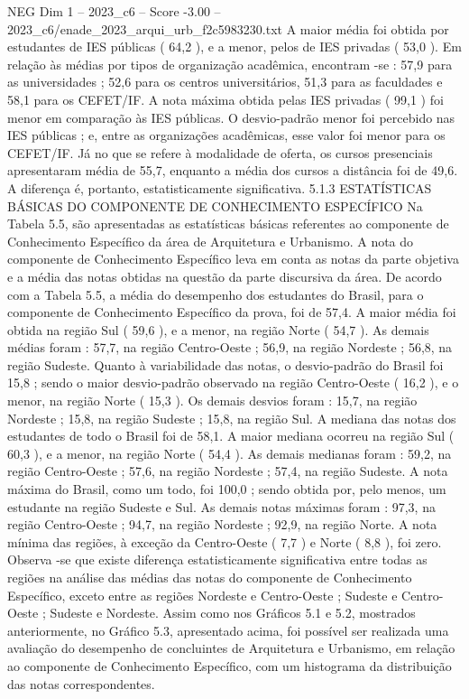 \begin{textsample}{NEG Dim 1 – 2023\_c6 – Score -3.00 – 2023\_c6/enade\_2023\_arqui\_urb\_f2c5983230.txt}
A maior média foi obtida por estudantes de IES públicas ( 64,2 ), e a menor, pelos de IES privadas ( 53,0 ).
Em relação às médias por tipos de organização acadêmica, encontram -se : 57,9 para as universidades ; 52,6 para os centros universitários, 51,3 para as faculdades e 58,1 para os CEFET/IF.
A nota máxima obtida pelas IES privadas ( 99,1 ) foi menor em comparação às IES públicas.
O desvio-padrão menor foi percebido nas IES públicas ; e, entre as organizações acadêmicas, esse valor foi menor para os CEFET/IF.
Já no que se refere à modalidade de oferta, os cursos presenciais apresentaram média de 55,7, enquanto a média dos cursos a distância foi de 49,6.
A diferença é, portanto, estatisticamente significativa. 5.1.3 ESTATÍSTICAS BÁSICAS DO COMPONENTE DE CONHECIMENTO ESPECÍFICO Na Tabela 5.5, são apresentadas as estatísticas básicas referentes ao componente de Conhecimento Específico da área de Arquitetura e Urbanismo.
A nota do componente de Conhecimento Específico leva em conta as notas da parte objetiva e a média das notas obtidas na questão da parte discursiva da área.
De acordo com a Tabela 5.5, a média do desempenho dos estudantes do Brasil, para o componente de Conhecimento Específico da prova, foi de 57,4.
A maior média foi obtida na região Sul ( 59,6 ), e a menor, na região Norte ( 54,7 ).
As demais médias foram : 57,7, na região Centro-Oeste ; 56,9, na região Nordeste ; 56,8, na região Sudeste.
Quanto à variabilidade das notas, o desvio-padrão do Brasil foi 15,8 ; sendo o maior desvio-padrão observado na região Centro-Oeste ( 16,2 ), e o menor, na região Norte ( 15,3 ).
Os demais desvios foram : 15,7, na região Nordeste ; 15,8, na região Sudeste ; 15,8, na região Sul.
A mediana das notas dos estudantes de todo o Brasil foi de 58,1.
A maior mediana ocorreu na região Sul ( 60,3 ), e a menor, na região Norte ( 54,4 ).
As demais medianas foram : 59,2, na região Centro-Oeste ; 57,6, na região Nordeste ; 57,4, na região Sudeste.
A nota máxima do Brasil, como um todo, foi 100,0 ; sendo obtida por, pelo menos, um estudante na região Sudeste e Sul.
As demais notas máximas foram : 97,3, na região Centro-Oeste ; 94,7, na região Nordeste ; 92,9, na região Norte.
A nota mínima das regiões, à exceção da Centro-Oeste ( 7,7 ) e Norte ( 8,8 ), foi zero.
Observa -se que existe diferença estatisticamente significativa entre todas as regiões na análise das médias das notas do componente de Conhecimento Específico, exceto entre as regiões Nordeste e Centro-Oeste ; Sudeste e Centro-Oeste ; Sudeste e Nordeste.
Assim como nos Gráficos 5.1 e 5.2, mostrados anteriormente, no Gráfico 5.3, apresentado acima, foi possível ser realizada uma avaliação do desempenho de concluintes de Arquitetura e Urbanismo, em relação ao componente de Conhecimento Específico, com um histograma da distribuição das notas correspondentes.

\end{textsample}

